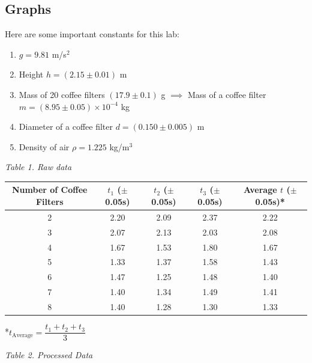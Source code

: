 \documentclass{article}
\begin{document}
\newpage
\subsection{Graphs}
Here are some important constants for this lab:
\begin{enumerate}
    \item $g=9.81$ m/s$^2$
    \item Height $h=(2.15\pm 0.01)$ m
    \item Mass of 20 coffee filters $(17.9\pm 0.1)$ g $\implies$ Mass of a coffee filter $m=\left(8.95\pm0.05\right)\times10^{-4}$ kg
    \item Diameter of a coffee filter $d=(0.150\pm 0.005)$ m
    \item Density of air $\rho=1.225$ kg/m$^3$
\end{enumerate}
\begin{center}
\textit{Table 1. Raw data}
\begin{tabular}{|c|c|c|c|c|}
\hline
    Number of Coffee Filters&	$t_1$ ($\pm$0.05s)&	    $t_2$ ($\pm$0.05s)&	    $t_3$ ($\pm$0.05s)&   Average $t$ ($\pm$0.05s)*\\\hline
    2&   	2.20&	    2.09&	2.37&        	2.22\\\hline
    3&   	2.07&	2.13&	2.03&        	2.08\\\hline
    4&   	1.67&	1.53&	1.80&	        1.67\\\hline
    5&   	1.33&	1.37&	1.58&        	1.43\\\hline
    6&   	1.47&	1.25&	1.48&        	1.40\\\hline
    7&   	1.40&	    1.34&	1.49&        	1.41\\\hline
    8&   	1.40&	    1.28&	1.30&            1.33\\\hline
\end{tabular}
\end{center}
*$t_\text{Average}=\dfrac{t_1+t_2+t_3}{3}$

\begin{center}
    \textit{Table 2. Processed Data}\\
\end{center}
\end{document}
